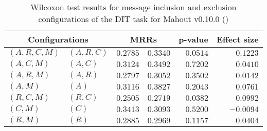 
\begin{table}
\begin{spacing}{1.2}
\centering
\caption{Wilcoxon test results for message inclusion and exclusion configurations of the DIT task for Mahout v0.10.0 (\ctwo)}
\label{table:versus-wilcox-mahout-dit-message}
\begin{tabular}{ll|rr|rr}
\toprule
      \multicolumn{2}{c|}{Configurations} &                \multicolumn{2}{c|}{MRRs} &             p-value & Effect size \\
\midrule
 $(A,R,C,M)$ &  $(A,R,C)$ &       $0.2785$ &  $\bm{0.3340}$ & $0.0514$ &    $0.1223$ \\
   $(A,C,M)$ &    $(A,C)$ &       $0.3124$ &  $\bm{0.3492}$ & $0.7202$ &    $0.0410$ \\
   $(A,R,M)$ &    $(A,R)$ &       $0.2797$ &  $\bm{0.3052}$ & $0.3502$ &    $0.0142$ \\
     $(A,M)$ &      $(A)$ &       $0.3116$ &  $\bm{0.3827}$ & $0.2043$ &    $0.0761$ \\
   $(R,C,M)$ &    $(R,C)$ &       $0.2505$ &  $\bm{0.2719}$ & $0.0382$ &    $0.0992$ \\
     $(C,M)$ &      $(C)$ &  $\bm{0.3413}$ &       $0.3093$ & $0.5200$ &   $-0.0094$ \\
     $(R,M)$ &      $(R)$ &       $0.2885$ &  $\bm{0.2969}$ & $0.1157$ &   $-0.0404$ \\
\bottomrule
\end{tabular}

\end{spacing}
\end{table}

